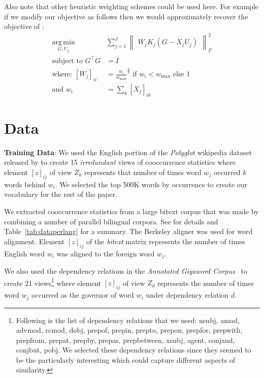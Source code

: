 \documentclass[11pt]{article}
\newcommand{\xline}[0]{\noindent\underline{\makebox[0.1cm][l]{}}}
\begin{document}
Also note that other heuristic weighting schemes could be used
here. For example if we modify our objective as follows then we would
approximately recover the objective of \cite{pennington2014glove}:
\begin{equation}
  \label{eq:gcca3}
\begin{split}
  \operatorname*{arg\,min}_{G,U_j} & \sum_{j=1}^J \begin{Vmatrix} W_j K_j(G - X_jU_j) \end{Vmatrix}^2_F \\
  \text{subject to } G^\top G &= I \\
  \text{where: } [W_j]_{ii} &= \frac{w_i}{w_{\max}}^{\frac{3}{4}} \text{ if } w_i <
  w_{\max} \text{ else } 1 \\
  \text{and } w_i &=  \sum_k [X_j]_{ik}
\end{split}
\end{equation}


\section{Data}
\label{sec:data}
\noindent\textbf{Training Data}: We used the English portion of the \textit{Polyglot} wikipedia dataset
released by  to create 15 \emph{irredundant} views of
cooccurrence statistics where element $[z]_{ij}$ of view $Z_k$
represents that number of times word $w_j$ occurred $k$ words behind
$w_i$.
We selected the top 500K words by occurrence to 
create our vocabulary for the rest of the paper.

We extracted cooccurrence statistics from a large bitext corpus that was made by combining a
number of parallel bilingual corpora. See \cite{ganitkevitch2013ppdb} for details and
Table~\ref{tab:dataperlang} for a summary. The Berkeley aligner was used for word alignment. Element
$[z]_{ij}$ of the \textit{bitext} matrix represents the number of times English
word $w_i$ was aligned to the foreign word $w_j$.

We also used the dependency relations in the \textit{Annotated
  Gigaword Corpus}~\cite{annotatedGigaword12} to create 21
views\footnote{Following is the list of dependency relations that we
  used: nsubj, amod, advmod, rcmod, dobj, prep\xline{}of,
  prep\xline{}in, prep\xline{}to, prep\xline{}on, prep\xline{}for,
  prep\xline{}with, prep\xline{}from, prep\xline{}at, prep\xline{}by,
  prep\xline{}as, prep\xline{}between, xsubj, agent, conj\xline{}and,
  conj\xline{}but, pobj. We selected these dependency relations since
  they seemed to be the particularly interesting which could capture
  different aspects of similarity.}  where element $[z]_{ij}$ of view
$Z_d$ represents the number of times word $w_j$ occurred
as the governor of word $w_i$ under dependency relation $d$.
\end{document}
